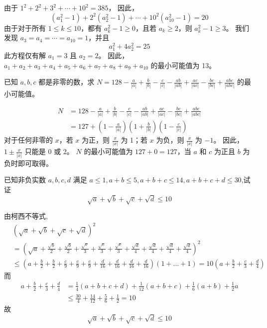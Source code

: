 \begin{questions}
\begin{solution}
由于 $1^2 + 2^2 + 3^2 + \cdots + 10^2 = 385$，
因此，
\[ (a_1^2 - 1) + 2^2(a_2^2 - 1) + \cdots + 10^2(a_{10}^2 - 1) = 20 \]
由于对于所有 $1 \le k \le 10$，都有 $a_k^2 - 1 \ge 0$，且若 $a_k \ge 2$，则 $a_k^2 - 1 \ge 3$。
我们发现 $a_3 = a_4 = \cdots = a_{10} = 1$，并且
\[ a_1^2 + 4a_2^2 = 25 \]
此方程仅有解 $a_1 = 3$ 且 $a_2 = 2$。
因此，$a_1 + a_2 + a_3 + a_4 + a_5 + a_6 + a_7 + a_8 + a_9 + a_{10}$ 的最小可能值为 13。
\end{solution}

\question 已知 $a, b, c$ 都是非零的数，求 $N = 128 - \frac{a}{|a|} + \frac{b}{|b|} - \frac{c}{|c|} - \frac{ab}{|ab|} + \frac{ac}{|ac|} - \frac{bc}{|bc|} + \frac{abc}{|abc|}$ 的最小可能值。

\begin{solution}
\begin{align*}
N &= 128 - \frac{a}{|a|} + \frac{b}{|b|} - \frac{c}{|c|} - \frac{ab}{|ab|} + \frac{ac}{|ac|} - \frac{bc}{|bc|} + \frac{abc}{|abc|} \\
&= 127 + \left( 1 - \frac{a}{|a|} \right) \left( 1 + \frac{b}{|b|} \right) \left( 1 - \frac{c}{|c|} \right)
\end{align*}
对于任何非零的 $x$，若 $x$ 为正，则 $\frac{x}{|x|}$ 为 1；若 $x$ 为负，则 $\frac{x}{|x|}$ 为 $-1$。
因此，$1 \pm \frac{x}{|x|}$ 只能是 0 或 2。
$N$ 的最小可能值为 $127 + 0 = 127$，当 $a$ 和 $c$ 为正且 $b$ 为负时即可取得。
\end{solution}
    
    \question 已知非负实数 $a, b, c,d$ 满足 $a \le 1, a+b \le 5, a+b+c \le 14, a+b+c+d \le 30$,试证
    \[
    \sqrt{a}+\sqrt{b}+\sqrt{c}+\sqrt{d}\le10
    \]
    \begin{solution}
        由柯西不等式,
        \begin{align*}
        &(\sqrt{a}+\sqrt{b}+\sqrt{c}+\sqrt{d})^2\\
        &=\left(\sqrt{a}+\frac{\sqrt{b}}{2}+\frac{\sqrt{b}}{2}+\frac{\sqrt{c}}{3}+\frac{\sqrt{c}}{3}+\frac{\sqrt{c}}{3}+\frac{\sqrt{d}}{4}+\frac{\sqrt{d}}{4}+\frac{\sqrt{d}}{4}+\frac{\sqrt{d}}{4}\right)^{2} \\
        &\le\left(a+\frac{b}{2}+\frac{b}{2}+\frac{c}{9}+\frac{c}{9}+\frac{c}{9}+\frac{d}{16}+\frac{d}{16}+\frac{d}{16}+\frac{d}{16}\right)(1+...+1)=10(a+\frac{b}{2}+\frac{c}{3}+\frac{d}{4})
        \end{align*}
        而
        \begin{align*}
        a+\frac{b}{2}+\frac{c}{3}+\frac{d}{4}&=\frac{1}{4}(a+b+c+d)+\frac{1}{12}(a+b+c)+\frac{1}{6}(a+b)+\frac{1}{2}a\\
        &\le\frac{30}{4}+\frac{14}{12}+\frac{5}{6}+\frac{1}{2}=10
        \end{align*}
        故
        $$\sqrt{a}+\sqrt{b}+\sqrt{c}+\sqrt{d}\le10$$
    \end{solution}


\end{questions}
